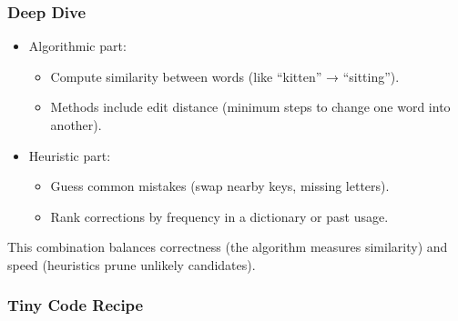 \documentclass[
  letterpaper,
  DIV=11,
  numbers=noendperiod]{scrreprt}
\providecommand{\tightlist}{%
  \setlength{\itemsep}{0pt}\setlength{\parskip}{0pt}}
\begin{document}
\subsubsection{Deep Dive}\label{deep-dive-57}

\begin{itemize}
\item
  Algorithmic part:

  \begin{itemize}
  \tightlist
  \item
    Compute similarity between words (like ``kitten'' → ``sitting'').
  \item
    Methods include edit distance (minimum steps to change one word into
    another).
  \end{itemize}
\item
  Heuristic part:

  \begin{itemize}
  \tightlist
  \item
    Guess common mistakes (swap nearby keys, missing letters).
  \item
    Rank corrections by frequency in a dictionary or past usage.
  \end{itemize}
\end{itemize}

This combination balances correctness (the algorithm measures
similarity) and speed (heuristics prune unlikely candidates).

\subsubsection{Tiny Code Recipe}\label{tiny-code-recipe-85}
\end{document}
